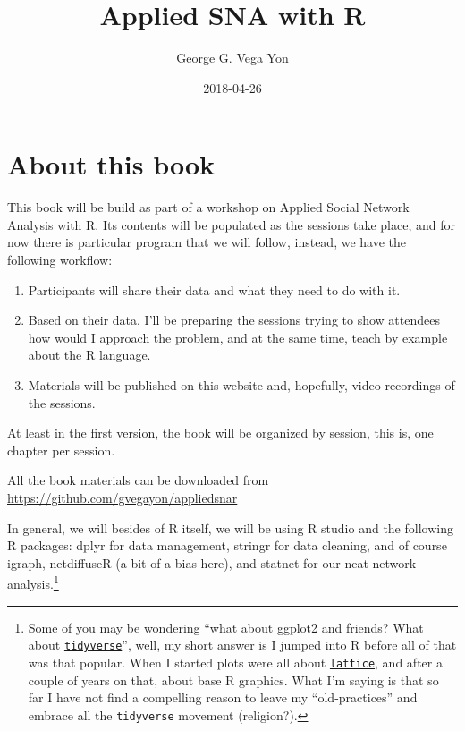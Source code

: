 \documentclass[]{book}
\title{Applied SNA with R}
\author{George G. Vega Yon}
\date{2018-04-26}
\let\rmarkdownfootnote\footnote%
\def\footnote{\protect\rmarkdownfootnote}
\theoremstyle{definition}
\theoremstyle{definition}
\theoremstyle{definition}
\theoremstyle{remark}
\begin{document}
\maketitle

{
\setcounter{tocdepth}{1}
\tableofcontents
}
\renewcommand{\Pr}[1]{\mbox{Pr}\left(#1\right)}
\renewcommand{\exp}[1]{\mbox{exp}\left\{#1\right\}}

\chapter{About this book}\label{about-this-book}

This book will be build as part of a workshop on Applied Social Network
Analysis with R. Its contents will be populated as the sessions take
place, and for now there is particular program that we will follow,
instead, we have the following workflow:

\begin{enumerate}
\def\labelenumi{\arabic{enumi}.}
\item
  Participants will share their data and what they need to do with it.
\item
  Based on their data, I'll be preparing the sessions trying to show
  attendees how would I approach the problem, and at the same time,
  teach by example about the R language.
\item
  Materials will be published on this website and, hopefully, video
  recordings of the sessions.
\end{enumerate}

At least in the first version, the book will be organized by session,
this is, one chapter per session.

All the book materials can be downloaded from
\url{https://github.com/gvegayon/appliedsnar}

In general, we will besides of R itself, we will be using R studio and
the following R packages: dplyr for data management, stringr for data
cleaning, and of course igraph, netdiffuseR (a bit of a bias here), and
statnet for our neat network analysis.\footnote{Some of you may be
  wondering ``what about ggplot2 and friends? What about
  \href{https://www.tidyverse.org/}{\texttt{tidyverse}}'', well, my
  short answer is I jumped into R before all of that was that popular.
  When I started plots were all about
  \href{https://CRAN.R-project.org/package=lattice}{\texttt{lattice}},
  and after a couple of years on that, about base R graphics. What I'm
  saying is that so far I have not find a compelling reason to leave my
  ``old-practices'' and embrace all the \texttt{tidyverse} movement
  (religion?).}
\end{document}

